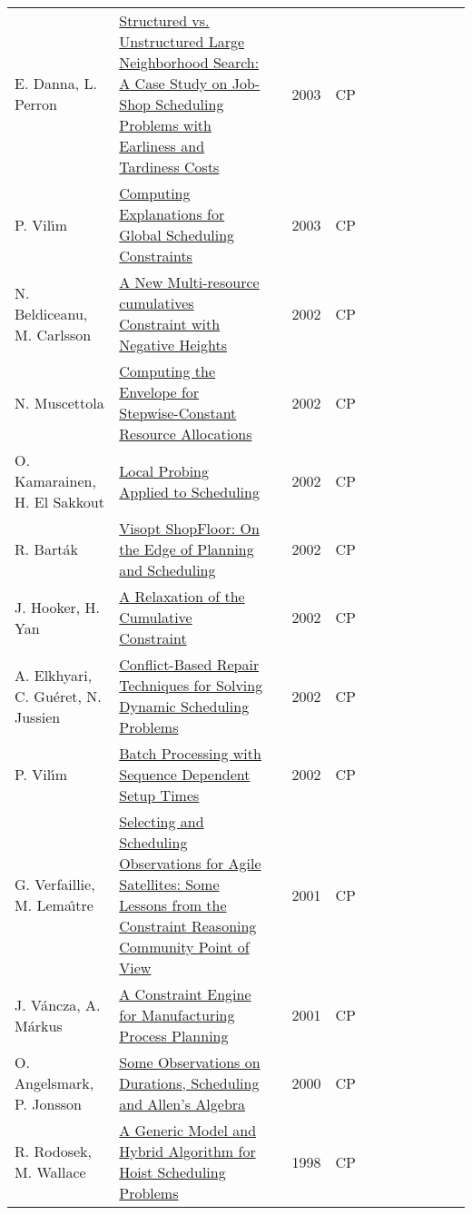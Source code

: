 \documentclass[a4paper]{article}
\begin{document}
{\begin{longtable}{p{3cm}p{6cm}rrcrlcccp{1.5cm}l}
E. Danna, L. Perron& \href{papers/DannaP03.pdf}{Structured vs. Unstructured Large Neighborhood Search: {A} Case Study on Job-Shop Scheduling Problems with Earliness and Tardiness Costs} & \cite{DannaP03} & 2003 & CP & & & & & & & \\
P. Vil{\'{\i}}m& \href{papers/Vilim03.pdf}{Computing Explanations for Global Scheduling Constraints} & \cite{Vilim03} & 2003 & CP & & & & & & & \\
N. Beldiceanu, M. Carlsson& \href{papers/BeldiceanuC02.pdf}{A New Multi-resource cumulatives Constraint with Negative Heights} & \cite{BeldiceanuC02} & 2002 & CP & & & & & & & \\
N. Muscettola& \href{papers/Muscettola02.pdf}{Computing the Envelope for Stepwise-Constant Resource Allocations} & \cite{Muscettola02} & 2002 & CP & & & & & & & \\
O. Kamarainen, H. El Sakkout& \href{papers/KamarainenS02.pdf}{Local Probing Applied to Scheduling} & \cite{KamarainenS02} & 2002 & CP & & & & & & & \\
R. Bart{\'{a}}k& \href{papers/Bartak02.pdf}{Visopt ShopFloor: On the Edge of Planning and Scheduling} & \cite{Bartak02} & 2002 & CP & & & & & & & \\
J. Hooker, H. Yan& \href{papers/HookerY02.pdf}{A Relaxation of the Cumulative Constraint} & \cite{HookerY02} & 2002 & CP & & & & & & & \\
A. Elkhyari, C. Gu{\'{e}}ret, N. Jussien& \href{papers/ElkhyariGJ02.pdf}{Conflict-Based Repair Techniques for Solving Dynamic Scheduling Problems} & \cite{ElkhyariGJ02} & 2002 & CP & & & & & & & \\
P. Vil{\'{\i}}m& \href{papers/Vilim02.pdf}{Batch Processing with Sequence Dependent Setup Times} & \cite{Vilim02} & 2002 & CP & & & & & & & \\
G. Verfaillie, M. Lema{\^{\i}}tre& \href{papers/VerfaillieL01.pdf}{Selecting and Scheduling Observations for Agile Satellites: Some Lessons from the Constraint Reasoning Community Point of View} & \cite{VerfaillieL01} & 2001 & CP & & & & & & & \\
J. V{\'{a}}ncza, A. M{\'{a}}rkus& \href{papers/VanczaM01.pdf}{A Constraint Engine for Manufacturing Process Planning} & \cite{VanczaM01} & 2001 & CP & & & & & & & \\
O. Angelsmark, P. Jonsson& \href{papers/AngelsmarkJ00.pdf}{Some Observations on Durations, Scheduling and Allen's Algebra} & \cite{AngelsmarkJ00} & 2000 & CP & & & & & & & \\
R. Rodosek, M. Wallace& \href{papers/RodosekW98.pdf}{A Generic Model and Hybrid Algorithm for Hoist Scheduling Problems} & \cite{RodosekW98} & 1998 & CP & & & & & & & \\

\end{longtable}}
\end{document}
